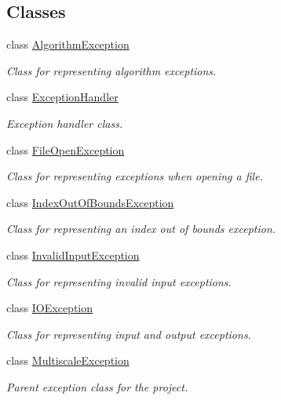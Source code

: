 \subsection*{\-Classes}
\begin{DoxyCompactItemize}
\item 
class \hyperlink{classmultiscale_1_1AlgorithmException}{\-Algorithm\-Exception}
\begin{DoxyCompactList}\small\item\em \-Class for representing algorithm exceptions. \end{DoxyCompactList}\item 
class \hyperlink{classmultiscale_1_1ExceptionHandler}{\-Exception\-Handler}
\begin{DoxyCompactList}\small\item\em \-Exception handler class. \end{DoxyCompactList}\item 
class \hyperlink{classmultiscale_1_1FileOpenException}{\-File\-Open\-Exception}
\begin{DoxyCompactList}\small\item\em \-Class for representing exceptions when opening a file. \end{DoxyCompactList}\item 
class \hyperlink{classmultiscale_1_1IndexOutOfBoundsException}{\-Index\-Out\-Of\-Bounds\-Exception}
\begin{DoxyCompactList}\small\item\em \-Class for representing an index out of bounds exception. \end{DoxyCompactList}\item 
class \hyperlink{classmultiscale_1_1InvalidInputException}{\-Invalid\-Input\-Exception}
\begin{DoxyCompactList}\small\item\em \-Class for representing invalid input exceptions. \end{DoxyCompactList}\item 
class \hyperlink{classmultiscale_1_1IOException}{\-I\-O\-Exception}
\begin{DoxyCompactList}\small\item\em \-Class for representing input and output exceptions. \end{DoxyCompactList}\item 
class \hyperlink{classmultiscale_1_1MultiscaleException}{\-Multiscale\-Exception}
\begin{DoxyCompactList}\small\item\em \-Parent exception class for the project. \end{DoxyCompactList}\item 

\end{DoxyCompactItemize}
